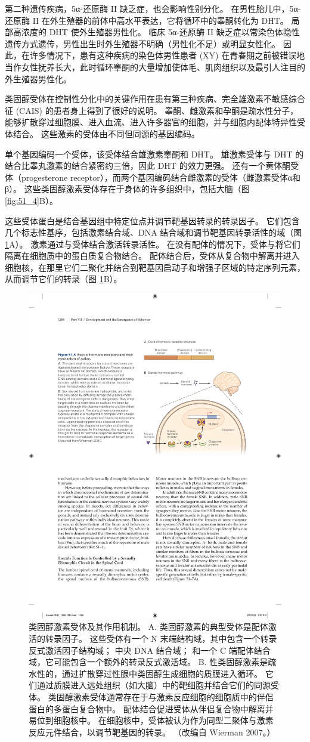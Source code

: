 第二种遗传疾病，5α-还原酶 II 缺乏症，也会影响性别分化。 在男性胎儿中，5α-还原酶 II 在外生殖器的前体中高水平表达，它将循环中的睾酮转化为 DHT。 局部高浓度的 DHT 使外生殖器男性化。 临床 5α-还原酶 II 缺乏症以常染色体隐性遗传方式遗传，男性出生时外生殖器不明确（男性化不足）或明显女性化。 因此，在许多情况下，患有这种疾病的染色体男性患者 (XY) 在青春期之前被错误地当作女性抚养长大，此时循环睾酮的大量增加使体毛、肌肉组织以及最引人注目的外生殖器男性化。

类固醇受体在控制性分化中的关键作用在患有第三种疾病、完全雄激素不敏感综合征 (CAIS) 的患者身上得到了很好的说明。 睾酮、雌激素和孕酮是疏水性分子，能够扩散穿过细胞膜、进入血流、进入许多器官的细胞，并与细胞内配体特异性受体结合。 这些激素的受体由不同但同源的基因编码。

单个基因编码一个受体，该受体结合雄激素睾酮和 DHT。 雄激素受体与 DHT 的结合比睾丸激素的结合紧密约三倍，因此 DHT 的效力更强。 还有一个黄体酮受体（progesterone receptor），而两个基因编码结合雌激素的受体（雌激素受体α和β）。 这些类固醇激素受体存在于身体的许多组织中，包括大脑（图 \ref{fig:51_4}B）。

这些受体蛋白是结合基因组中特定位点并调节靶基因转录的转录因子。 它们包含几个标志性基序，包括激素结合域、DNA 结合域和调节靶基因转录活性的域（图 \ref{fig:51_5}A）。 激素通过与受体结合激活转录活性。 在没有配体的情况下，受体与将它们隔离在细胞质中的蛋白质复合物结合。 配体结合后，受体从复合物中解离并进入细胞核，在那里它们二聚化并结合到靶基因启动子和增强子区域的特定序列元素，从而调节它们的转录（图 \ref{fig:51_5}B）。

\begin{figure}[htbp]
	\centering
	\includegraphics[width=0.6\linewidth]{chap51/fig_51_5}
	\caption{类固醇激素受体及其作用机制。 A. 类固醇激素的典型受体是配体激活的转录因子。 这些受体有一个 N 末端结构域，其中包含一个转录反式激活因子结构域； 中央 DNA 结合域； 和一个 C 端配体结合域，它可能包含一个额外的转录反式激活域。 B. 性类固醇激素是疏水性的，通过扩散穿过性腺中类固醇生成细胞的质膜进入循环。 它们通过质膜进入远处组织（如大脑）中的靶细胞并结合它们的同源受体。 类固醇激素受体通常存在于与激素反应细胞的细胞质中的伴侣蛋白的多蛋白复合物中。 配体结合促进受体从伴侣复合物中解离并易位到细胞核中。 在细胞核中，受体被认为作为同型二聚体与激素反应元件结合，以调节靶基因的转录。 （改编自 Wierman 2007。）}
	\label{fig:51_5}
\end{figure}

